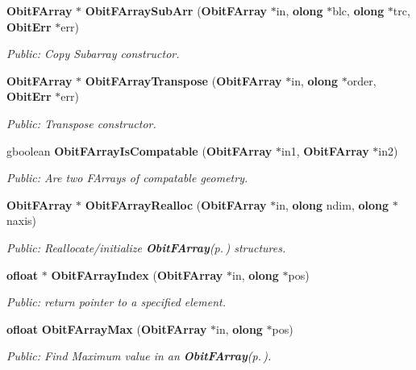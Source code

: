 \begin{CompactItemize}
{\bf Obit\-FArray} $\ast$ {\bf Obit\-FArray\-Sub\-Arr} ({\bf Obit\-FArray} $\ast$in, {\bf olong} $\ast$blc, {\bf olong} $\ast$trc, {\bf Obit\-Err} $\ast$err)
\begin{CompactList}\small\item\em Public: Copy Subarray constructor. \item\end{CompactList}\item 
{\bf Obit\-FArray} $\ast$ {\bf Obit\-FArray\-Transpose} ({\bf Obit\-FArray} $\ast$in, {\bf olong} $\ast$order, {\bf Obit\-Err} $\ast$err)
\begin{CompactList}\small\item\em Public: Transpose constructor. \item\end{CompactList}\item 
gboolean {\bf Obit\-FArray\-Is\-Compatable} ({\bf Obit\-FArray} $\ast$in1, {\bf Obit\-FArray} $\ast$in2)
\begin{CompactList}\small\item\em Public: Are two FArrays of compatable geometry. \item\end{CompactList}\item 
{\bf Obit\-FArray} $\ast$ {\bf Obit\-FArray\-Realloc} ({\bf Obit\-FArray} $\ast$in, {\bf olong} ndim, {\bf olong} $\ast$naxis)
\begin{CompactList}\small\item\em Public: Reallocate/initialize {\bf Obit\-FArray}{\rm (p.\,\pageref{structObitFArray})} structures. \item\end{CompactList}\item 
{\bf ofloat} $\ast$ {\bf Obit\-FArray\-Index} ({\bf Obit\-FArray} $\ast$in, {\bf olong} $\ast$pos)
\begin{CompactList}\small\item\em Public: return pointer to a specified element. \item\end{CompactList}\item 
{\bf ofloat} {\bf Obit\-FArray\-Max} ({\bf Obit\-FArray} $\ast$in, {\bf olong} $\ast$pos)
\begin{CompactList}\small\item\em Public: Find Maximum value in an {\bf Obit\-FArray}{\rm (p.\,\pageref{structObitFArray})}. \item\end{CompactList}\item 

\end{CompactItemize}
